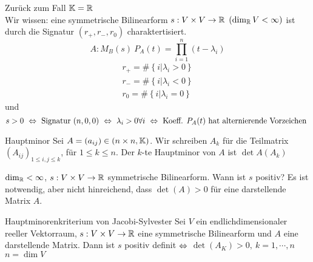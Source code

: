 \begin{Faz}
  Zurück zum Fall $\mathbb{K}=\mathbb{R}$\\
  Wir wissen: eine symmetrische Bilinearform $s:V\times V\to\mathbb{R}$ $(\dim_{\mathbb{R}}V<\infty)$ ist durch die Signatur $(r_+,r_-,r_0)$ charaktertisiert.
  \[A:M_B(s)\ P_A(t)=\prod^n_{i=1}(t-\lambda_i)\]
  \begin{gather*}
    r_+=\#\left\{ i|\lambda_i>0 \right\}\\
    r_-=\#\left\{ i|\lambda_i<0 \right\}\\ 
    r_0=\#\left\{ i|\lambda_i=0 \right\}
  \end{gather*}
  und
  \[s>0\ \Lra\ \text{Signatur } (n,0,0)\ \Lra\ \lambda_i>0\forall i\ \Lra\ \text{Koeff. }P_A(t)\ \text{hat alternierende Vorzeichen }\]
\end{Faz}
\begin{Def}{Hauptminor}
  Sei $A=(a_{ij})\in(n\times n, \mathbb{K})$. Wir schreiben $A_k$ für die Teilmatrix $(A_{ij})_{1\leq i,j\leq k}$, für $1\leq k\leq n$. Der $k$-te Hauptminor von $A$ ist $\det A(A_k)$
\end{Def}
\begin{Bem}
  $\dim_{\mathbb{R}}<\infty$, $s:V\times V\to\mathbb{R}$ symmetrische Bilinearform. Wann ist $s$ positiv? Es ist notwendig, aber nicht hinreichend, dass $\det(A)>0$ für eine darstellende Matrix $A$.
\end{Bem}
\begin{Prop}{Hauptminorenkriterium von Jacobi-Sylvester}
  Sei $V$ ein endlichdimensionaler reeller Vektorraum, $s:V\times V\to\mathbb{R}$ eine symmetrische Bilinearform und $A$ eine darstellende Matrix. Dann ist $s$ positiv definit $\Leftrightarrow$ $\det(A_K)>0,\ k=1,\cdots,n$ $n=\dim V$
\end{Prop}
